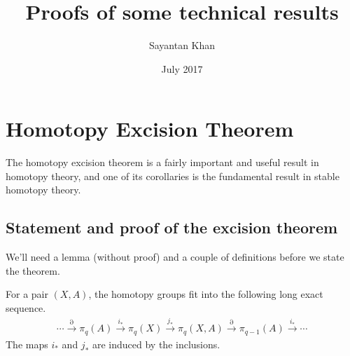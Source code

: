 

\title{Proofs of some technical results}
\author{Sayantan Khan}
\date{July 2017}

\newcommand{\cat}[1]{\mathrm{#1}}
\newcommand{\cohomtheorie}{{h}^{\ast}}
\newcommand{\calz}{\mathcal{Z}}
\newcommand{\redco}{\widetilde{h}}
\newcommand{\dv}{\mathrm{DV}}
\newcommand{\coker}{\mathrm{coker}}

\makeatletter
\newcommand{\colim@}[2]{%
  \vtop{\m@th\ialign{##\cr
    \hfil$#1\operator@font colim$\hfil\cr
    \noalign{\nointerlineskip\kern1.5\ex@}#2\cr
    \noalign{\nointerlineskip\kern-\ex@}\cr}}%
}
\newcommand{\colim}{%
  \mathop{\mathpalette\colim@{\rightarrowfill@\textstyle}}\nmlimits@
}
\makeatother

\usepackage{todonotes}


\maketitle

\tableofcontents


\newpage

\section{Homotopy Excision Theorem}
\label{sec:hom-exc-theor}

The homotopy excision theorem is a fairly important and useful result in homotopy theory, and one of
its corollaries is the fundamental result in stable homotopy theory.

\subsection{Statement and proof of the excision theorem}
\label{sec:stat-proof-excis}

We'll need a lemma (without proof) and a couple of definitions before we state the theorem.

\begin{lem}
  For a pair $(X,A)$, the homotopy groups fit into the following long exact sequence.
  \begin{align*}
    \cdots \xrightarrow{\partial} \pi_q(A) \xrightarrow{i_{\ast}} \pi_q(X) \xrightarrow{j_{\ast}}
    \pi_q(X,A) \xrightarrow{\partial} \pi_{q-1}(A) \xrightarrow{i_{\ast}}\cdots
  \end{align*}
  The maps $i_{\ast}$ and $j_{\ast}$ are induced by the inclusions.
\end{lem}

